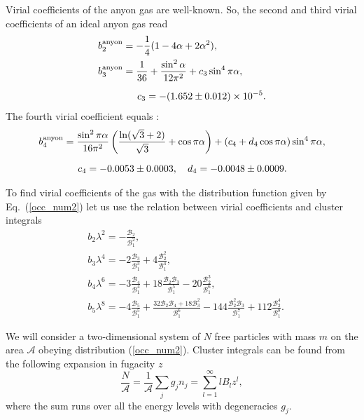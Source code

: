 \documentclass[12pt,a4paper]{article}
\begin{document}
Virial coefficients of the anyon gas are well-known. So, the second and third virial coefficients of an ideal anyon gas read \cite{Mashkevich_etal:1996}
\begin{align}\label{4}
&b_2^{\rm anyon}=-\frac{1}{4}(1-4\alpha+2\alpha^2),\nonumber \\
&b_3^{\rm anyon}=\frac{1}{36}+\frac{\sin^2{\alpha}}{12\pi^2}+c_3\sin^4{\pi\alpha},\\[6pt]
&\qquad\qquad c_3=-(1.652\pm0.012)\times 10^{-5}.\nonumber
\end{align}
The fourth virial coefficient equals \cite{Kristoffersen_etal:1998}:
\begin{align}\label{5}
&b_4^{\rm anyon}=\frac{\sin^2\pi\alpha}{16\pi^2}\left(\frac{\ln(\sqrt{3}+2)}{\sqrt{3}}+\cos\pi\alpha\right)
	+(c_4+d_4\cos\pi\alpha)\sin^4\pi\alpha,\\[6pt]
&\qquad\qquad
c_4=-0.0053\pm 0.0003,\quad 
d_4=-0.0048\pm 0.0009. \nonumber
\end{align}

To find virial coefficients of the gas with the distribution function given by Eq.~(\ref{occ_num2}) let us use the relation between virial coefficients and cluster integrals~\cite{Borges_etal:1999}
\begin{align}\label{6}
&b_2\lambda^2=-\frac{\mathcal{B}_2}{\mathcal{B}_1^2}, \nonumber \\[6pt]
&b_3\lambda^4=-2\frac{\mathcal{B}_3}{\mathcal{B}_1^3}+4\frac{\mathcal{B}_2^2}{\mathcal{B}_1^4},\\[6pt]
&b_4\lambda^6=-3\frac{\mathcal{B}_4}{\mathcal{B}_1^4}+18\frac{\mathcal{B}_2\mathcal{B}_3}{\mathcal{B}_1^5}-20\frac{\mathcal{B}_2^3}{\mathcal{B}_1^6}, \nonumber\\[6pt]
&b_5\lambda^8=-4\frac{\mathcal{B}_5}{\mathcal{B}_1^5}
+\frac{32 \mathcal{B}_2 \mathcal{B}_4 + 18 \mathcal{B}_3^2}{\mathcal{B}_1^6} 
- 144 \frac{\mathcal{B}_2^2 \mathcal{B}_3}{\mathcal{B}_1^7} + 112 \frac{\mathcal{B}_2^4}{\mathcal{B}_1^8}.\nonumber
\end{align}

We will consider a two-dimensional system of $N$ free particles with mass $m$ on the area ${\mathcal{A}}$ obeying distribution (\ref{occ_num2}). Cluster integrals can be found from the following expansion in fugacity $z$ \cite{Khare:2005}
\begin{equation}\label{7}
\frac{N}{\mathcal{A}}=\frac{1}{\mathcal{A}}\sum_{j}g_jn_j=\sum_{l=1}^{\infty}lB_lz^l,
\end{equation}
where the sum runs over all the energy levels with degeneracies $g_j$.
	
\end{document}
